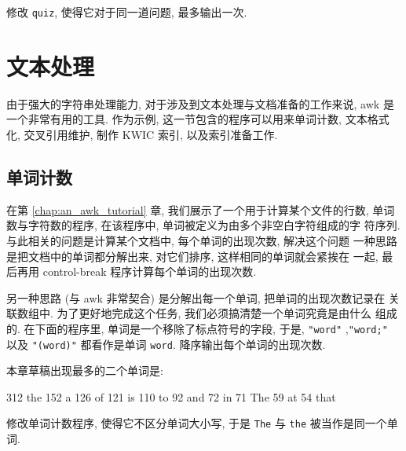\begin{exercise}
    修改 \texttt{quiz}, 使得它对于同一道问题, 最多输出一次.
\end{exercise}

\section{文本处理}
\label{sec:text_processing}

由于强大的字符串处理能力, 对于涉及到文本处理与文档准备的工作来说, awk 是
一个非常有用的工具. 作为示例, 这一节包含的程序可以用来单词计数, 文本格式
化, 交叉引用维护, 制作 KWIC 索引, 以及索引准备工作.

\subsection{单词计数}
\label{subsec:word_counts}

在第 \ref{chap:an_awk_tutorial} 章, 我们展示了一个用于计算某个文件的行数,
单词数与字符数的程序, 在该程序中, 单词被定义为由多个非空白字符组成的字
符序列. 与此相关的问题是计算某个文档中, 每个单词的出现次数, 解决这个问题
一种思路是把文档中的单词都分解出来, 对它们排序, 这样相同的单词就会紧挨在
一起, 最后再用 control-break 程序计算每个单词的出现次数.

另一种思路 (与 awk 非常契合) 是分解出每一个单词, 把单词的出现次数记录在
关联数组中. 为了更好地完成这个任务, 我们必须搞清楚一个单词究竟是由什么
组成的. 在下面的程序里, 单词是一个移除了标点符号的字段, 于是,
\texttt{"word"} ,\texttt{"word;"} 以及 \texttt{"(word)"} 都看作是单词
\texttt{word}. \END 降序输出每个单词的出现次数.
本章草稿出现最多的二个单词是:
\begin{file}
    312 the     152 a       126 of      121 is      110 to
    92 and      72 in       71 The      59 at       54 that
\end{file}

\begin{exercise}
    修改单词计数程序, 使得它不区分单词大小写, 于是 \texttt{The} 与
    \texttt{the} 被当作是同一个单词.
\end{exercise}

